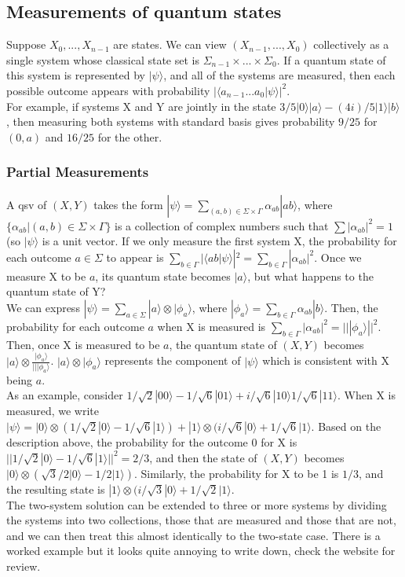 \documentclass{amsart}
\begin{document}
\subsection*{Measurements of quantum states}
Suppose $ X_0,...,X_{n-1} $ are states. We can view $ (X_{n-1},...,X_0) $ collectively as a
single system whose classical state set is $ \Sigma_{n-1} \times ... \times \Sigma_0 $.
If a quantum state of this system is represented by $ |\psi \rangle $, and all of the systems
are measured, then each possible outcome appears with probability
$ |\langle a_{n-1}...a_0| \psi \rangle|^2 $. \\
For example, if systems X and Y are jointly in the state $ 3/5|0\rangle |a\rangle -
(4i)/5 |1\rangle |b\rangle $, then measuring both systems with standard basis gives
probability $ 9/25 $ for $ (0,a) $ and $ 16/25 $ for the other.
\subsubsection*{Partial Measurements}
A qsv of $ (X,Y) $ takes the form $ |\psi \rangle = \sum_{(a,b) \in \Sigma \times \Gamma}
\alpha_{ab}|ab \rangle $, where $ \{\alpha_{ab} | (a,b) \in \Sigma \times \Gamma \} $ is a
collection of complex numbers such that $ \sum |\alpha_{ab}|^2 = 1 $ (so $ |\psi\rangle $ is a
unit vector. If we only measure the first system X, the probability for each outcome
$ a \in \Sigma $ to appear is $ \sum_{b \in \Gamma}|\langle ab|\psi \rangle|^2 =
\sum_{b \in \Gamma} |\alpha_{ab}|^2 $. Once we measure X to be $ a $, its quantum
state becomes $ |a \rangle $, but what happens to the quantum state of Y? \\
We can express $ |\psi \rangle = \sum_{a \in \Sigma} |a \rangle \otimes |\phi_a \rangle $,
where $ |\phi_a \rangle = \sum_{b \in \Gamma} \alpha_{ab} |b\rangle $. Then, the probability
for each outcome $ a $ when X is measured is $ \sum_{b \in \Gamma} |\alpha_{ab}|^2 =
|||\phi_a \rangle||^2 $. Then, once X is measured to be $ a $, the quantum state of $ (X,Y) $
becomes $ |a\rangle \otimes \frac{|\phi_a \rangle}{|||\phi_a\rangle} $.
$ |a\rangle \otimes |\phi_a \rangle $ represents the component of $ |\psi \rangle $ which is
consistent with X being $ a $. \\
As an example, consider $ 1/\sqrt{2}|00\rangle - 1/\sqrt{6}|01\rangle + i/\sqrt{6} |10\rangle
1/\sqrt{6}|11\rangle $. When X is measured, we write $ |\psi\rangle = |0 \rangle \otimes
(1/\sqrt{2}|0\rangle - 1/\sqrt{6}|1 \rangle) + |1\rangle \otimes (i/\sqrt{6}|0\rangle +
1/\sqrt{6}|1 \rangle $. Based on the description above, the probability for the outcome 0 for
X is $ ||1/\sqrt{2}|0\rangle - 1/\sqrt{6}|1\rangle||^2 = 2/3 $, and then the state of
$ (X,Y) $ becomes $ |0\rangle \otimes (\sqrt{3}/2|0\rangle - 1/2 |1\rangle) $. Similarly, the
probability for X to be 1 is $ 1/3 $, and the resulting state is
$ |1\rangle \otimes (i/\sqrt{3}|0\rangle + 1/\sqrt{2}|1\rangle $. \\
The two-system solution can be extended to three or more systems by dividing the systems into
two collections, those that are measured and those that are not, and we can then treat this
almost identically to the two-state case. There is a worked example but it looks quite
annoying to write down, check the website for review. \\
\end{document}
